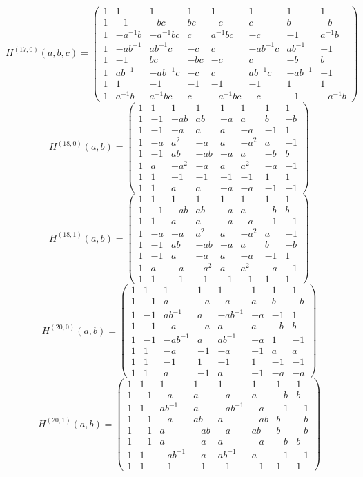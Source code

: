 \documentclass[11pt,a4paper]{article}
\theoremstyle{plain}
\theoremstyle{definition}
\numberwithin{equation}{section}
\begin{document}
\medskip
{\small\setlength{\arraycolsep}{5pt}$$H^{(17,0)}(a,b,c)=
\begin{pmatrix}
1&1&1&1&1&1&1&1\\1&-1&-bc&bc&-c&c&b&-b\\1&-a^{-1}b&-a^{-1}bc&c&a^{-1}bc&-c&-1&a^{-1}b\\1&-ab^{-1}&ab^{-1}c&-c&c&-ab^{-1}c&ab^{-1}&-1\\1&-1&bc&-bc&-c&c&-b&b\\1&ab^{-1}&-ab^{-1}c&-c&c&ab^{-1}c&-ab^{-1}&-1\\1&1&-1&-1&-1&-1&1&1\\1&a^{-1}b&a^{-1}bc&c&-a^{-1}bc&-c&-1&-a^{-1}b
\end{pmatrix}$$}
\medskip
{\small\setlength{\arraycolsep}{5pt}$$H^{(18,0)}(a,b)=
\begin{pmatrix}
1&1&1&1&1&1&1&1\\1&-1&-ab&ab&-a&a&b&-b\\1&-1&-a&a&a&-a&-1&1\\1&-a&a^{2}&-a&a&-a^{2}&a&-1\\1&-1&ab&-ab&-a&a&-b&b\\1&a&-a^{2}&-a&a&a^{2}&-a&-1\\1&1&-1&-1&-1&-1&1&1\\1&1&a&a&-a&-a&-1&-1
\end{pmatrix}$$}
\medskip
{\small\setlength{\arraycolsep}{5pt}$$H^{(18,1)}(a,b)=
\begin{pmatrix}
1&1&1&1&1&1&1&1\\1&-1&-ab&ab&-a&a&-b&b\\1&1&a&a&-a&-a&-1&-1\\1&-a&-a&a^{2}&a&-a^{2}&a&-1\\1&-1&ab&-ab&-a&a&b&-b\\1&-1&a&-a&a&-a&-1&1\\1&a&-a&-a^{2}&a&a^{2}&-a&-1\\1&1&-1&-1&-1&-1&1&1
\end{pmatrix}$$}
\medskip
{\small\setlength{\arraycolsep}{5pt}$$H^{(20,0)}(a,b)=
\begin{pmatrix}
1&1&1&1&1&1&1&1\\1&-1&a&-a&-a&a&b&-b\\1&-1&ab^{-1}&a&-ab^{-1}&-a&-1&1\\1&-1&-a&-a&a&a&-b&b\\1&-1&-ab^{-1}&a&ab^{-1}&-a&1&-1\\1&1&-a&-1&-a&-1&a&a\\1&1&-1&1&-1&1&-1&-1\\1&1&a&-1&a&-1&-a&-a
\end{pmatrix}$$}
\medskip
{\small\setlength{\arraycolsep}{5pt}$$H^{(20,1)}(a,b)=
\begin{pmatrix}
1&1&1&1&1&1&1&1\\1&-1&-a&a&-a&a&-b&b\\1&1&ab^{-1}&a&-ab^{-1}&-a&-1&-1\\1&-1&-a&ab&a&-ab&b&-b\\1&-1&a&-ab&-a&ab&b&-b\\1&-1&a&-a&a&-a&-b&b\\1&1&-ab^{-1}&-a&ab^{-1}&a&-1&-1\\1&1&-1&-1&-1&-1&1&1
\end{pmatrix}$$}
\end{document}
